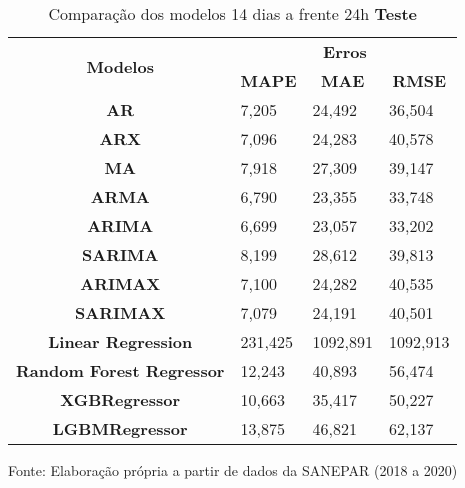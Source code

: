 \begin{table}[H]
	\centering
	\caption{Comparação dos modelos 14 dias a frente 24h \textbf{Teste} }\label{tb:30-24tst}
	\begin{tabular}{@{}clll@{}}
		\toprule
		\multirow{2}{*}{\textbf{Modelos}} & \multicolumn{3}{c}{\textbf{Erros}}                                                                       \\ \cmidrule(l){2-4} 
		& \multicolumn{1}{c}{\textbf{MAPE}} & \multicolumn{1}{c}{\textbf{MAE}} & \multicolumn{1}{c}{\textbf{RMSE}} \\ \hline
\textbf{AR}                       & 7,205                             & 24,492                           & 36,504                            \\
\textbf{ARX}                      & 7,096                             & 24,283                           & 40,578                            \\
\textbf{MA}                       & 7,918                             & 27,309                           & 39,147                            \\
\textbf{ARMA}                     & 6,790                             & 23,355                           & 33,748                            \\
\textbf{ARIMA}                    & 6,699                             & 23,057                           & 33,202                            \\
\textbf{SARIMA}                   & 8,199                             & 28,612                           & 39,813                            \\
\textbf{ARIMAX}                   & 7,100                             & 24,282                           & 40,535                            \\
\textbf{SARIMAX}                  & 7,079                             & 24,191                           & 40,501                            \\
\textbf{Linear Regression}        & 231,425                           & 1092,891                         & 1092,913                          \\
\textbf{Random Forest Regressor}  & 12,243                            & 40,893                           & 56,474                            \\
\textbf{XGBRegressor}             & 10,663                            & 35,417                           & 50,227                            \\
\textbf{LGBMRegressor}            & 13,875                            & 46,821                           & 62,137                            \\ \bottomrule
	\end{tabular}

Fonte: Elaboração própria a partir de dados da SANEPAR (2018 a 2020)
\end{table}

